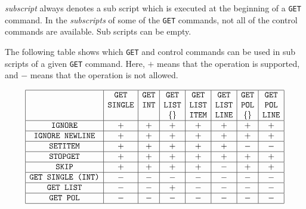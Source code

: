 \documentclass{article}
\begin{document}
\emph{subscript} always denotes a sub script which is executed at the
beginning of a \texttt{GET} command. In the \emph{subscripts} of some
of the \texttt{GET} commands, not all of the control commands are
available. Sub scripts can be empty.

The following table shows which \texttt{GET} and control commands can
be used in sub scripts of a given \texttt{GET} command. Here, $+$
means that the operation is supported, and $-$ means that the
operation is not allowed.

\begin{displaymath}
\begin{array}{|c|c|c|c|c|c|c|c|}
\hline
                           & \texttt{GET}    & \texttt{GET} & \texttt{GET}  & \texttt{GET}  & \texttt{GET}  & \texttt{GET}  & \texttt{GET}  \\
                           & \texttt{SINGLE} & \texttt{INT} & \texttt{LIST} & \texttt{LIST} & \texttt{LIST} & \texttt{POL}  & \texttt{POL}  \\
                           &                 &              & \{ \}         & \texttt{ITEM} & \texttt{LINE} & \{ \}         & \texttt{LINE} \\
\hline
\texttt{IGNORE}            & +               & +            & +             & +             & +             & +             & +             \\
\hline
\texttt{IGNORE NEWLINE}    & +               & +            & +             & +             & +             & +             & +             \\
\hline
\texttt{SETITEM}           & +               & +            & +             & +             & +             & -             & -             \\
\hline
\texttt{STOPGET}           & +               & +            & +             & +             & +             & +             & +             \\
\hline
\texttt{SKIP}              & +               & +            & +             & +             & -             & +             & +             \\
\hline
\texttt{GET SINGLE (INT)}  & -               & -            & -             & -             & -             & -             & -             \\
\hline
\texttt{GET LIST}          & -               & -            & +             & -             & -             & -             & -             \\
\hline
\texttt{GET POL}           & -               & -            & -             & -             & -             & -             & -             \\
\hline
\end{array}
\end{displaymath}
\end{document}
